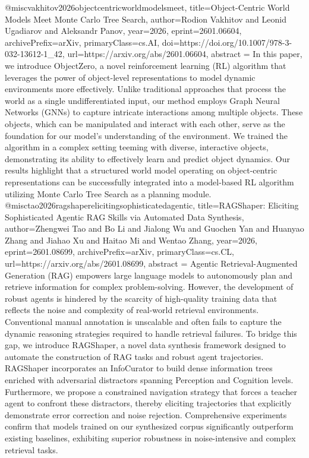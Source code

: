 {}@misc{vakhitov2026objectcentricworldmodelsmeet,
      title={Object-Centric World Models Meet Monte Carlo Tree Search}, 
      author={Rodion Vakhitov and Leonid Ugadiarov and Aleksandr Panov},
      year={2026},
      eprint={2601.06604},
      archivePrefix={arXiv},
      primaryClass={cs.AI},
      doi={https://doi.org/10.1007/978-3-032-13612-1_42},
      url={https://arxiv.org/abs/2601.06604},
      abstract = {In this paper, we introduce ObjectZero, a novel reinforcement learning (RL) algorithm that leverages the power of object-level representations to model dynamic environments more effectively. Unlike traditional approaches that process the world as a single undifferentiated input, our method employs Graph Neural Networks (GNNs) to capture intricate interactions among multiple objects. These objects, which can be manipulated and interact with each other, serve as the foundation for our model's understanding of the environment. We trained the algorithm in a complex setting teeming with diverse, interactive objects, demonstrating its ability to effectively learn and predict object dynamics. Our results highlight that a structured world model operating on object-centric representations can be successfully integrated into a model-based RL algorithm utilizing Monte Carlo Tree Search as a planning module.}
}@misc{tao2026ragshaperelicitingsophisticatedagentic,
      title={RAGShaper: Eliciting Sophisticated Agentic RAG Skills via Automated Data Synthesis}, 
      author={Zhengwei Tao and Bo Li and Jialong Wu and Guochen Yan and Huanyao Zhang and Jiahao Xu and Haitao Mi and Wentao Zhang},
      year={2026},
      eprint={2601.08699},
      archivePrefix={arXiv},
      primaryClass={cs.CL},
      url={https://arxiv.org/abs/2601.08699},
      abstract = {Agentic Retrieval-Augmented Generation (RAG) empowers large language models to autonomously plan and retrieve information for complex problem-solving. However, the development of robust agents is hindered by the scarcity of high-quality training data that reflects the noise and complexity of real-world retrieval environments. Conventional manual annotation is unscalable and often fails to capture the dynamic reasoning strategies required to handle retrieval failures. To bridge this gap, we introduce RAGShaper, a novel data synthesis framework designed to automate the construction of RAG tasks and robust agent trajectories. RAGShaper incorporates an InfoCurator to build dense information trees enriched with adversarial distractors spanning Perception and Cognition levels. Furthermore, we propose a constrained navigation strategy that forces a teacher agent to confront these distractors, thereby eliciting trajectories that explicitly demonstrate error correction and noise rejection. Comprehensive experiments confirm that models trained on our synthesized corpus significantly outperform existing baselines, exhibiting superior robustness in noise-intensive and complex retrieval tasks.}
}
